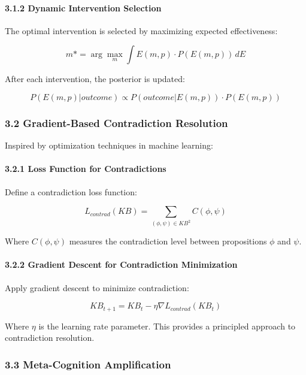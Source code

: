 \documentclass[
]{article}
\begin{document}
\paragraph{3.1.2 Dynamic Intervention
Selection}\label{dynamic-intervention-selection}

The optimal intervention is selected by maximizing expected
effectiveness:

\[m* = \arg\max_m \int E(m, p) \cdot P(E(m, p)) \, dE\]

After each intervention, the posterior is updated:

\[P(E(m, p) | outcome) \propto P(outcome | E(m, p)) \cdot P(E(m, p))\]

\subsubsection{3.2 Gradient-Based Contradiction
Resolution}\label{gradient-based-contradiction-resolution}

Inspired by optimization techniques in machine learning:

\paragraph{3.2.1 Loss Function for
Contradictions}\label{loss-function-for-contradictions}

Define a contradiction loss function:

\[L_{contrad}(KB) = \sum_{(\phi, \psi) \in KB^2} C(\phi, \psi)\]

Where \(C(\phi, \psi)\) measures the contradiction level between
propositions \(\phi\) and \(\psi\).

\paragraph{3.2.2 Gradient Descent for Contradiction
Minimization}\label{gradient-descent-for-contradiction-minimization}

Apply gradient descent to minimize contradiction:

\[KB_{t+1} = KB_t - \eta \nabla L_{contrad}(KB_t)\]

Where \(\eta\) is the learning rate parameter. This provides a
principled approach to contradiction resolution.

\subsubsection{3.3 Meta-Cognition
Amplification}\label{meta-cognition-amplification}
\end{document}

